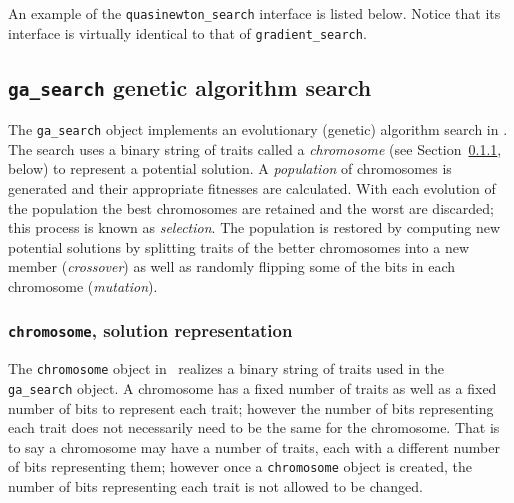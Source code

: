 An example of the {\tt quasinewton\_search} interface is listed below.
Notice that its interface is virtually identical to that of
{\tt gradient\_search}.


\subsection{{\tt ga\_search} genetic algorithm search}
\label{module:optim:ga_search}

The {\tt ga\_search} object implements an evolutionary (genetic)
algorithm search in \liquid.
The search uses a binary string of traits called a {\em chromosome}
(see Section~\ref{module:optim:ga_search:chromosome}, below)
to represent a potential solution.
A {\em population} of chromosomes is generated and their appropriate
fitnesses are calculated.
With each evolution of the population the best chromosomes are retained
and the worst are discarded; this process is known as {\em selection}.
The population is restored by computing new potential solutions by
splitting traits of the better chromosomes into a new member
({\em crossover}) as well as randomly flipping some of the bits in each
chromosome ({\em mutation}).

\subsubsection{{\tt chromosome}, solution representation}
\label{module:optim:ga_search:chromosome}
The {\tt chromosome} object in \liquid\ realizes a binary string of
traits used in the {\tt ga\_search} object.
A chromosome has a fixed number of traits as well as a fixed number of
bits to represent each trait;
however the number of bits representing each trait does not necessarily
need to be the same for the chromosome.
That is to say a chromosome may have a number of traits, each with a
different number of bits representing them;
however once a {\tt chromosome} object is created, the number of bits
representing each trait is not allowed to be changed.

